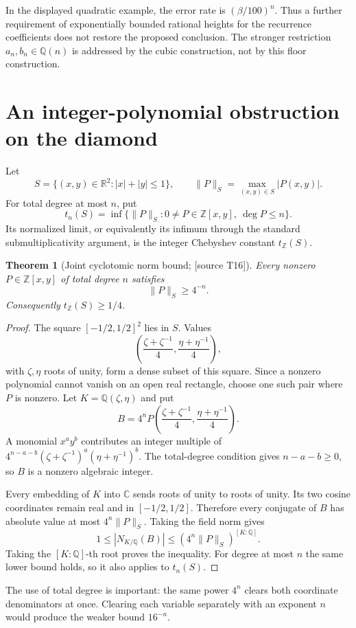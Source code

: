 \documentclass[11pt,a4paper]{article}
\newtheorem{theorem}{Theorem}[section]
\theoremstyle{definition}\newtheorem{definition}[theorem]{Definition}
\theoremstyle{remark}\newtheorem{remark}[theorem]{Remark}
\newcommand{\Q}{\mathbb Q}\newcommand{\Z}{\mathbb Z}\newcommand{\N}{\mathbb N}\newcommand{\R}{\mathbb R}\newcommand{\C}{\mathbb C}
\newcommand{\sourceT}[1]{\textup{[source T#1]}}
\begin{document}
In the displayed quadratic example, the error rate is $(\beta/100)^n$. Thus a further requirement of exponentially bounded rational heights for the recurrence coefficients does not restore the proposed conclusion. The stronger restriction $a_n,b_n\in\Q(n)$ is addressed by the cubic construction, not by this floor construction.

\section{An integer-polynomial obstruction on the diamond}\label{sec:diamond}
Let
\[
 S=\{(x,y)\in\R^2:|x|+|y|\le1\},\qquad
 \|P\|_S=\max_{(x,y)\in S}|P(x,y)|.
\]
For total degree at most $n$, put
\[
 t_n(S)=\inf\{\|P\|_S:0\ne P\in\Z[x,y],\ \deg P\le n\}.
\]
Its normalized limit, or equivalently its infimum through the standard submultiplicativity argument, is the integer Chebyshev constant $t_\Z(S)$.

\begin{theorem}[Joint cyclotomic norm bound; \sourceT{16}]\label{thm:diamond}
Every nonzero $P\in\Z[x,y]$ of total degree $n$ satisfies
\[
 \|P\|_S\ge4^{-n}.
\]
Consequently $t_\Z(S)\ge1/4$.
\end{theorem}
\begin{proof}
The square $[-1/2,1/2]^2$ lies in $S$. Values
\[
 \left(\frac{\zeta+\zeta^{-1}}4,
       \frac{\eta+\eta^{-1}}4\right),
\]
with $\zeta,\eta$ roots of unity, form a dense subset of this square. Since a nonzero polynomial cannot vanish on an open real rectangle, choose one such pair where $P$ is nonzero. Let $K=\Q(\zeta,\eta)$ and put
\[
 B=4^nP\left(\frac{\zeta+\zeta^{-1}}4,
             \frac{\eta+\eta^{-1}}4\right).
\]
A monomial $x^ay^b$ contributes an integer multiple of
$4^{n-a-b}(\zeta+\zeta^{-1})^a(\eta+\eta^{-1})^b$. The total-degree condition gives $n-a-b\ge0$, so $B$ is a nonzero algebraic integer.

Every embedding of $K$ into $\C$ sends roots of unity to roots of unity. Its two cosine coordinates remain real and in $[-1/2,1/2]$. Therefore every conjugate of $B$ has absolute value at most $4^n\|P\|_S$. Taking the field norm gives
\[
 1\le|N_{K/\Q}(B)|\le(4^n\|P\|_S)^{[K:\Q]}.
\]
Taking the $[K:\Q]$-th root proves the inequality. For degree at most $n$ the same lower bound holds, so it also applies to $t_n(S)$.
\end{proof}

The use of total degree is important: the same power $4^n$ clears both coordinate denominators at once. Clearing each variable separately with an exponent $n$ would produce the weaker bound $16^{-n}$.
\end{document}
